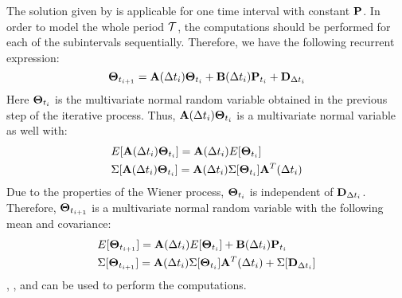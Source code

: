 The solution given by  is applicable for one time interval with constant $\mathbf{P}$. In order to model the whole period $\mathcal{T}$, the computations should be performed for each of the subintervals sequentially. Therefore, we have the following recurrent expression:
\begin{equation} \equlabel{recurrence}
  \vtemperature_{\time_{i + 1}} = \m{A}(\timeinterval_i) \vtemperature_{\time_i} + \m{B}(\timeinterval_i) \vpower_{\time_i} + \m{D}_{\timeinterval_i}
\end{equation}
Here $\mathbf{\Theta}_{t_i}$ is the multivariate normal random variable obtained in the previous step of the iterative process. Thus, $\mathbf{A}(\Delta t_i) \mathbf{\Theta}_{t_i}$ is a multivariate normal variable as well with:
\begin{align*}
  & E[\mathbf{A}(\Delta t_i) \mathbf{\Theta}_{t_i}] = \mathbf{A}(\Delta t_i)E[\mathbf{\Theta}_{t_i}] \\
  & \Sigma[\mathbf{A}(\Delta t_i) \mathbf{\Theta}_{t_i}] = \mathbf{A}(\Delta t_i) \Sigma[\mathbf{\Theta}_{t_i}] \mathbf{A}^T(\Delta t_i)
\end{align*}
Due to the properties of the Wiener process, $\mathbf{\Theta}_{t_i}$ is independent of $\mathbf{D}_{\Delta t_i}$. Therefore, $\mathbf{\Theta}_{t_{i+1}}$ is a multivariate normal random variable with the following mean and covariance:
\begin{align*}
  & E[\mathbf{\Theta}_{t_{i+1}}] = \mathbf{A}(\Delta t_i)E[\mathbf{\Theta}_{t_i}] + \mathbf{B}(\Delta t_i) \mathbf{P}_{t_i} \\
  & \Sigma[\mathbf{\Theta}_{t_{i+1}}] = \mathbf{A}(\Delta t_i) \Sigma[\mathbf{\Theta}_{t_i}] \mathbf{A}^T(\Delta t_i) + \Sigma[\mathbf{D}_{\Delta t_i}]
\end{align*}
, , and  can be used to perform the computations.
